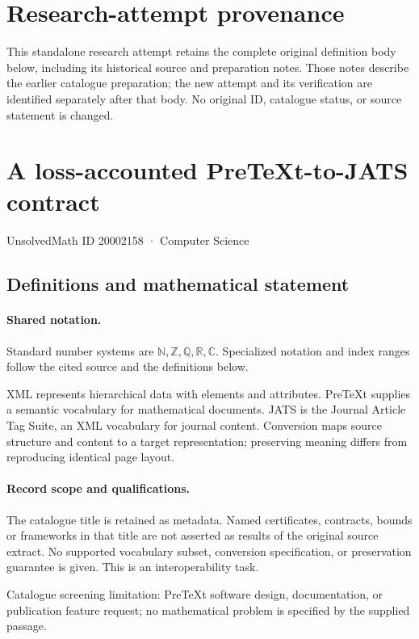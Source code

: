 \documentclass[11pt]{article}
\begin{document}
\section*{Research-attempt provenance}
This standalone research attempt retains the complete original definition body below,
including its historical source and preparation notes. Those notes describe the
earlier catalogue preparation; the new attempt and its verification are identified
separately after that body. No original ID, catalogue status, or source statement is changed.

\section{A loss-accounted PreTeXt-to-JATS contract}\label{20002158}
{\small UnsolvedMath ID 20002158 · Computer Science}
\subsection{Definitions and mathematical statement}

\paragraph{Shared notation.}Standard number systems are $\mathbb N,\mathbb Z,\mathbb Q,\mathbb R,\mathbb C$. Specialized notation and index ranges follow the cited source and the definitions below.


XML represents hierarchical data with elements and attributes. PreTeXt supplies a semantic vocabulary for mathematical documents. JATS is the Journal Article Tag Suite, an XML vocabulary for journal content. Conversion maps source structure and content to a target representation; preserving meaning differs from reproducing identical page layout.
\paragraph{Record scope and qualifications.}
The catalogue title is retained as metadata. Named certificates, contracts, bounds or frameworks in that title are not asserted as results of the original source extract.
No supported vocabulary subset, conversion specification, or preservation guarantee is given. This is an interoperability task.

Catalogue screening limitation: PreTeXt software design, documentation, or publication feature request; no mathematical problem is specified by the supplied passage.
\end{document}
